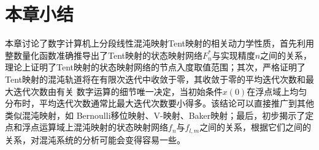 \section{本章小结}

本章讨论了数字计算机上分段线性混沌映射Tent映射的相关动力学性质，首先利用整数量化函数准确推导出了Tent映射的状态映射网络$F^*_{n}$与实现精度$n$之间的关系，
理论上证明了Tent映射的状态映射网络的节点入度取值范围；其次，严格证明了Tent映射的混沌轨道将在有限次迭代中收敛于零，其收敛于零的平均迭代次数和最大迭代次数由有关
数字运算的细节唯一决定，当初始条件$x(0)$在浮点域上均匀分布时，平均迭代次数通常比最大迭代次数要小得多。该结论可以直接推广到其他类似混沌映射，如
Bernoulli移位映射、V-映射、Baker映射；最后，初步揭示了定点和浮点运算域上混沌映射的状态映射网络$f_{n}$与$f_{l, m}$之间的关系，根据它们之间的
关系，对混沌系统的分析可能会变得容易一些。